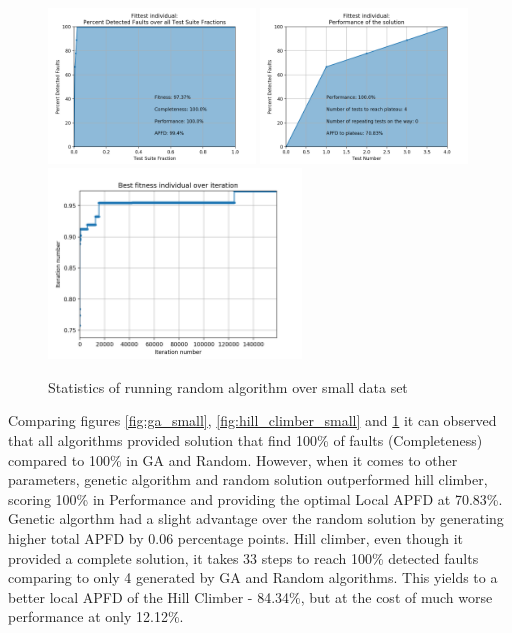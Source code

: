 \documentclass[12pt]{article}
\begin{document}
\begin{figure}[H]
  \centering
  \includegraphics[width=0.49\textwidth]{random_small_apfd_total}
  \includegraphics[width=0.49\textwidth]{random_small_apfd_local}
  \includegraphics[width=0.6\textwidth]{random_small_fitness_all}
  \caption{Statistics of running random algorithm over small data set}
  \label{fig:random_small}
\end{figure}

Comparing figures \ref{fig:ga_small}, \ref{fig:hill_climber_small} and \ref{fig:random_small} it can observed that all algorithms provided solution that find 100\% of faults (Completeness) compared to 100\% in GA and Random. However, when it comes to other parameters, genetic algorithm and random solution outperformed hill climber, scoring 100\% in Performance and providing the optimal Local APFD at 70.83\%. Genetic algorthm had a slight advantage over the random solution by generating higher total APFD by 0.06 percentage points. Hill climber, even though it provided a complete solution, it takes 33 steps to reach 100\% detected faults comparing to only 4 generated by GA and Random algorithms. This yields to a better local APFD of the Hill Climber - 84.34\%, but at the cost of much worse performance at only 12.12\%.
\end{document}
